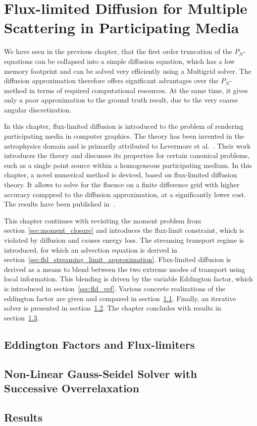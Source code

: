 \chapter{Flux-limited Diffusion for Multiple Scattering in Participating Media}
\label{sec:fld}

We have seen in the previous chapter, that the first order truncation of the $P_N$-equations can be collapsed into a simple diffusion equation, which has a low memory footprint and can be solved very efficiently using a Multigrid solver. The diffusion approximation therefore offers significant advantages over the $P_N$-method in terms of required computational resources. At the same time, it gives only a poor approximation to the ground truth result, due to the very coarse angular discretization.

In this chapter, flux-limited diffusion is introduced to the problem of rendering participating media in computer graphics. The theory has been invented in the astrophysics domain and is primarily attributed to Levermore et al.~\cite{Levermore81}. Their work introduces the theory and discusses its properties for certain canonical problems, such as a single point source within a homogeneous participating medium. In this chapter, a novel numerical method is deviced, based on flux-limited diffusion theory. It allows to solve for the fluence on a finite difference grid with higher accuracy comppred to the diffusion approximation, at a significantly lower cost. The results have been published in~\cite{Koerner14}.

This chapter continues with revisiting the moment problem from section~\ref{sec:moment_closure} and introduces the flux-limit constraint, which is violated by diffusion and causes energy loss. The streaming transport regime is introduced, for which an advection equation is derived in section~\ref{sec:fld_streaming_limit_approximation}. Flux-limited diffusion is derived as a means to blend between the two extreme modes of transport using local information. This blending is driven by the variable Eddington factor, which is introduced in section~\ref{sec:fld_vef}. Various concrete realizations of the eddington factor are given and compared in section~\ref{sec:fld_vef_factors}. Finally, an iterative solver is presented in section~\ref{sec:fld_solver}. The chapter concludes with results in section~\ref{sec:fld_results}.











\section{Eddington Factors and Flux-limiters}
\label{sec:fld_vef_factors}

\section{Non-Linear Gauss-Seidel Solver with Successive Overrelaxation}
\label{sec:fld_solver}

\section{Results}
\label{sec:fld_results}

